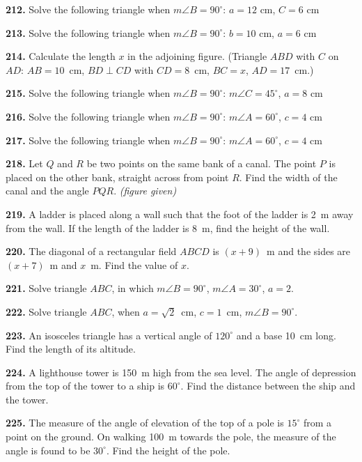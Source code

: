 \documentclass[11pt]{article}
\begin{document}
\bigskip
\noindent\textbf{212.} Solve the following triangle when $m\angle B = 90^{\circ}$: $a = 12$ cm, $C = 6$ cm

\bigskip
\noindent\textbf{213.} Solve the following triangle when $m\angle B = 90^{\circ}$: $b = 10$ cm, $a = 6$ cm

\bigskip
\noindent\textbf{214.} Calculate the length $x$ in the adjoining figure. (Triangle $ABD$ with $C$ on $AD$: $AB = 10$~cm, $BD \perp CD$ with $CD = 8$~cm, $BC = x$, $AD = 17$~cm.)

\bigskip
\noindent\textbf{215.} Solve the following triangle when $m\angle B = 90^{\circ}$: $m\angle C = 45^{\circ}$, $a = 8$ cm

\bigskip
\noindent\textbf{216.} Solve the following triangle when $m\angle B = 90^{\circ}$: $m\angle A = 60^{\circ}$, $c = 4$ cm

\bigskip
\noindent\textbf{217.} Solve the following triangle when $m\angle B = 90^{\circ}$: $m\angle A = 60^{\circ}$, $c = 4$ cm

\bigskip
\noindent\textbf{218.} Let $Q$ and $R$ be two points on the same bank of a canal. The point $P$ is placed on the other bank, straight across from point $R$. Find the width of the canal and the angle $PQR$. \textit{(figure given)}

\bigskip
\noindent\textbf{219.} A ladder is placed along a wall such that the foot of the ladder is 2~m away from the wall. If the length of the ladder is 8~m, find the height of the wall.

\bigskip
\noindent\textbf{220.} The diagonal of a rectangular field $ABCD$ is $(x+9)$~m and the sides are $(x+7)$~m and $x$~m. Find the value of $x$.

\bigskip
\noindent\textbf{221.} Solve triangle $ABC$, in which $m\angle B = 90^{\circ}$, $m\angle A = 30^{\circ}$, $a = 2$.

\bigskip
\noindent\textbf{222.} Solve triangle $ABC$, when $a = \sqrt{2}$~cm, $c = 1$~cm, $m\angle B = 90^{\circ}$.

\bigskip
\noindent\textbf{223.} An isosceles triangle has a vertical angle of $120^{\circ}$ and a base 10~cm long. Find the length of its altitude.

\bigskip
\noindent\textbf{224.} A lighthouse tower is 150~m high from the sea level. The angle of depression from the top of the tower to a ship is $60^{\circ}$. Find the distance between the ship and the tower.

\bigskip
\noindent\textbf{225.} The measure of the angle of elevation of the top of a pole is $15^{\circ}$ from a point on the ground. On walking 100~m towards the pole, the measure of the angle is found to be $30^{\circ}$. Find the height of the pole.
\end{document}
